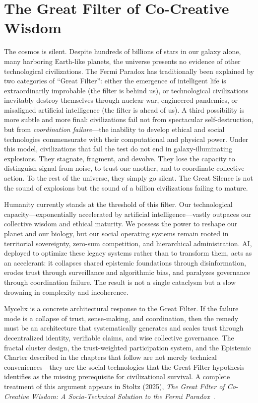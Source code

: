 \documentclass[12pt]{book}
\begin{document}
\section{The Great Filter of Co-Creative Wisdom}

The cosmos is silent. Despite hundreds of billions of stars in our galaxy alone,
many harboring Earth-like planets, the universe presents no evidence of other
technological civilizations. The Fermi Paradox has traditionally been explained
by two categories of ``Great Filter'': either the emergence of intelligent life
is extraordinarily improbable (the filter is behind us), or technological
civilizations inevitably destroy themselves through nuclear war, engineered
pandemics, or misaligned artificial intelligence (the filter is ahead of us).
A third possibility is more subtle and more final: civilizations fail not from
spectacular self-destruction, but from \emph{coordination failure}---the inability
to develop ethical and social technologies commensurate with their computational
and physical power. Under this model, civilizations that fail the test do not
end in galaxy-illuminating explosions. They stagnate, fragment, and devolve.
They lose the capacity to distinguish signal from noise, to trust one another,
and to coordinate collective action. To the rest of the universe, they simply
go silent. The Great Silence is not the sound of explosions but the sound of
a billion civilizations failing to mature.

Humanity currently stands at the threshold of this filter. Our technological
capacity---exponentially accelerated by artificial intelligence---vastly outpaces
our collective wisdom and ethical maturity. We possess the power to reshape our
planet and our biology, but our social operating systems remain rooted in
territorial sovereignty, zero-sum competition, and hierarchical administration.
AI, deployed to optimize these legacy systems rather than to transform them,
acts as an accelerant: it collapses shared epistemic foundations through
disinformation, erodes trust through surveillance and algorithmic bias, and
paralyzes governance through coordination failure. The result is not a single
cataclysm but a slow drowning in complexity and incoherence.

Mycelix is a concrete architectural response to the Great Filter. If the failure
mode is a collapse of trust, sense-making, and coordination, then the remedy must
be an architecture that systematically generates and scales trust through
decentralized identity, verifiable claims, and wise collective governance.
The fractal cluster design, the trust-weighted participation system, and the
Epistemic Charter described in the chapters that follow are not merely technical
conveniences---they are the social technologies that the Great Filter hypothesis
identifies as the missing prerequisite for civilizational survival. A complete
treatment of this argument appears in Stoltz (2025), \textit{The Great Filter
of Co-Creative Wisdom: A Socio-Technical Solution to the Fermi Paradox}~\cite{stoltz2025filter}.
\end{document}
